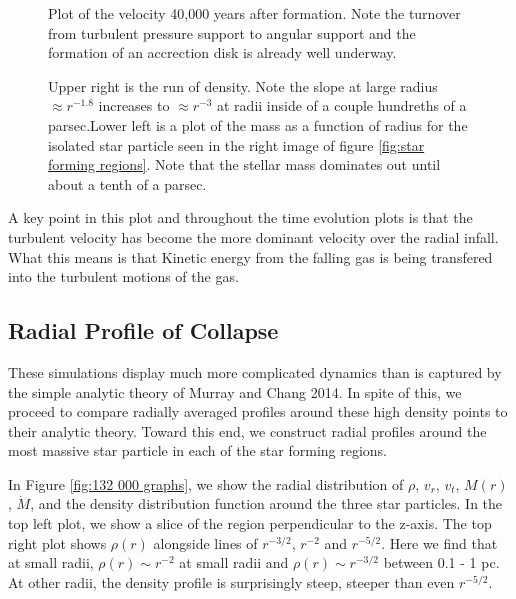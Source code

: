 \documentclass{emulateapj}
\begin{document}
\begin{figure}
\caption{Plot of the velocity 40,000 years after formation. Note the turnover from turbulent  pressure support to angular support and the formation of an accrection disk is already well underway.
\label{fig:quad3_200_velocity}}
\end{figure}


\begin{figure}
\caption{Upper right is the run of density. Note the slope at large radius $\approx r^{-1.8}$ increases to $\approx r^{-3}$ at radii inside of a couple hundreths of a parsec.Lower left is a plot of the mass as a function of radius for the isolated star particle seen in the right image of figure \ref{fig:star forming regions}. Note that the stellar mass dominates out until about a tenth of a parsec.
\label{fig:quad3_320_four}}
\end{figure}

A key point in this plot and throughout the time evolution plots is that the turbulent velocity has become the more dominant velocity over the radial infall. What this means is that Kinetic energy from the falling gas is being transfered into the turbulent motions of the gas.

\subsection{Radial Profile of Collapse}

These simulations display much more complicated dynamics than is captured by the simple analytic theory of Murray and Chang 2014.  In spite of this, we proceed to compare radially averaged profiles around these high density points to their analytic theory.  Toward this end, we construct radial profiles around the most massive star particle in each of the star forming regions.

In Figure \ref{fig:132 000 graphs}, we show the radial distribution of $\rho$, $v_r$, $v_t$, $M(r)$, $\dot{M}$, and the density distribution function around the three star particles.  In the top left plot, we show a slice of the region perpendicular to the z-axis.  The top right plot shows $\rho(r)$ alongside lines of $r^{-3/2}$, $r^{-2}$ and $r^{-5/2}$.  Here we find that at small radii, $\rho(r)\sim r^{-2}$ at small radii and $\rho(r) \sim r^{-3/2}$ between 0.1 - 1 pc. At other radii, the density profile is surprisingly steep, steeper than even $r^{-5/2}$.
\end{document}
